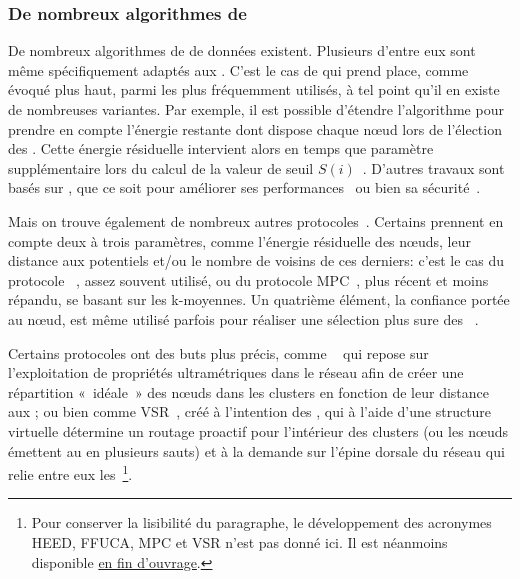         \subsubsection{De nombreux algorithmes de }

De nombreux algorithmes de  de données existent.
Plusieurs d'entre eux sont même spécifiquement adaptés aux \rcsfs.
C'est le cas de \leach qui prend place, comme évoqué plus haut, parmi les plus fréquemment utilisés, à tel point qu'il en existe de nombreuses variantes.
Par exemple, il est possible d'étendre l'algorithme pour prendre en compte l'énergie restante dont dispose chaque nœud lors de l'élection des \CH.
Cette énergie résiduelle intervient alors en temps que paramètre supplémentaire lors du calcul de la valeur de seuil $S(i)$~\cite{HHT02}.
D'autres travaux sont basés sur \leach, que ce soit pour améliorer ses performances~\cite{RR13,CJ14} ou bien sa sécurité~\cite{OFVWBDL07}.

Mais on trouve également de nombreux autres protocoles~\cite{AY07,DQWH13}.
Certains prennent en compte deux à trois paramètres, comme l'énergie résiduelle des nœuds, leur distance aux \chs potentiels et/ou le nombre de voisins de ces derniers: c'est le cas du protocole \heed~\cite{YF04}, assez souvent utilisé, ou du protocole MPC~\cite{KTAA12}, plus récent et moins répandu, se basant sur les k-moyennes.
Un quatrième élément, la confiance portée au nœud, est même utilisé parfois pour réaliser une sélection plus sure des \CH~\cite{KMSL09}.

Certains protocoles ont des buts plus précis, comme \ffuca~\cite{FL11,FMMMI12} qui repose sur l'exploitation de propriétés ultramétriques dans le réseau afin de créer une répartition « idéale » des nœuds dans les clusters en fonction de leur distance aux \CH; ou bien comme VSR~\cite{TV08}, créé à l'intention des , qui à l'aide d'une structure virtuelle détermine un routage proactif pour l'intérieur des clusters (ou les nœuds émettent au \ch en plusieurs sauts) et à la demande sur l'épine dorsale du réseau qui relie entre eux les \CH\,\footnote{Pour conserver la lisibilité du paragraphe, le développement des acronymes HEED, FFUCA, MPC et VSR n'est pas donné ici. Il est néanmoins disponible \hyperref[acronymes]{en fin d'ouvrage}.}.


